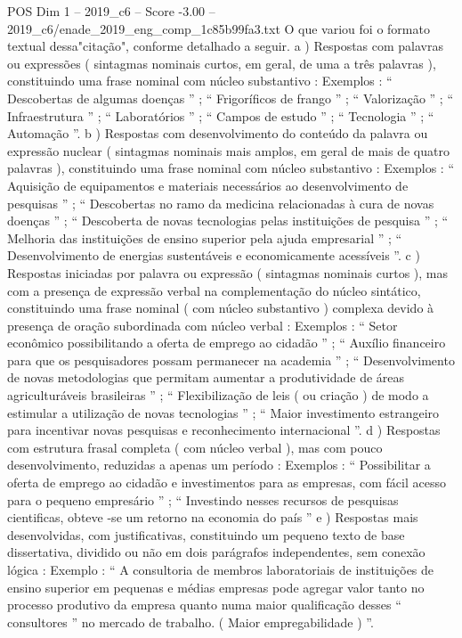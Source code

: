 \begin{textsample}{POS Dim 1 – 2019\_c6 – Score -3.00 – 2019\_c6/enade\_2019\_eng\_comp\_1c85b99fa3.txt}
O que variou foi o formato textual dessa"citação", conforme detalhado a seguir. a ) Respostas com palavras ou expressões ( sintagmas nominais curtos, em geral, de uma a três palavras ), constituindo uma frase nominal com núcleo substantivo : Exemplos : “ Descobertas de algumas doenças ” ; “ Frigoríficos de frango ” ; “ Valorização ” ; “ Infraestrutura ” ; “ Laboratórios ” ; “ Campos de estudo ” ; “ Tecnologia ” ; “ Automação ”. b ) Respostas com desenvolvimento do conteúdo da palavra ou expressão nuclear ( sintagmas nominais mais amplos, em geral de mais de quatro palavras ), constituindo uma frase nominal com núcleo substantivo : Exemplos : “ Aquisição de equipamentos e materiais necessários ao desenvolvimento de pesquisas ” ; “ Descobertas no ramo da medicina relacionadas à cura de novas doenças ” ; “ Descoberta de novas tecnologias pelas instituições de pesquisa ” ; “ Melhoria das instituições de ensino superior pela ajuda empresarial ” ; “ Desenvolvimento de energias sustentáveis e economicamente acessíveis ”. c ) Respostas iniciadas por palavra ou expressão ( sintagmas nominais curtos ), mas com a presença de expressão verbal na complementação do núcleo sintático, constituindo uma frase nominal ( com núcleo substantivo ) complexa devido à presença de oração subordinada com núcleo verbal : Exemplos : “ Setor econômico possibilitando a oferta de emprego ao cidadão ” ; “ Auxílio financeiro para que os pesquisadores possam permanecer na academia ” ; “ Desenvolvimento de novas metodologias que permitam aumentar a produtividade de áreas agriculturáveis brasileiras ” ; “ Flexibilização de leis ( ou criação ) de modo a estimular a utilização de novas tecnologias ” ; “ Maior investimento estrangeiro para incentivar novas pesquisas e reconhecimento internacional ”. d ) Respostas com estrutura frasal completa ( com núcleo verbal ), mas com pouco desenvolvimento, reduzidas a apenas um período : Exemplos : “ Possibilitar a oferta de emprego ao cidadão e investimentos para as empresas, com fácil acesso para o pequeno empresário ” ; “ Investindo nesses recursos de pesquisas cientificas, obteve -se um retorno na economia do país ” e ) Respostas mais desenvolvidas, com justificativas, constituindo um pequeno texto de base dissertativa, dividido ou não em dois parágrafos independentes, sem conexão lógica : Exemplo : “ A consultoria de membros laboratoriais de instituições de ensino superior em pequenas e médias empresas pode agregar valor tanto no processo produtivo da empresa quanto numa maior qualificação desses “ consultores ” no mercado de trabalho. ( Maior empregabilidade ) ”.

\end{textsample}
